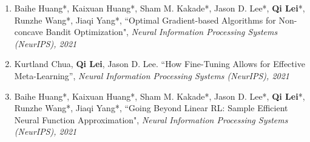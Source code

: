 \documentclass[margin, 10pt]{res} %
\begin{document}
\begin{resume}
\begin{enumerate}
\item {Baihe Huang*, Kaixuan Huang*, Sham M. Kakade*, Jason D. Lee*, \textbf{Qi Lei}*, Runzhe Wang*, Jiaqi Yang*,  ``Optimal Gradient-based Algorithms for Non-concave Bandit Optimization", 	\textit{Neural Information Processing Systems (NeurIPS), 2021} }


\item 	{ Kurtland Chua, \textbf{Qi Lei}, Jason D. Lee. ``How Fine-Tuning Allows for Effective Meta-Learning”, \textit{Neural Information Processing Systems (NeurIPS), 2021} }



\item {Baihe Huang*, Kaixuan Huang*, Sham M. Kakade*, Jason D. Lee*, \textbf{Qi Lei}*, Runzhe Wang*, Jiaqi Yang*, ``Going Beyond Linear RL: Sample Efficient Neural Function Approximation", \textit{Neural Information Processing Systems (NeurIPS), 2021} }
	

\end{enumerate}
\end{resume}
\end{document}
